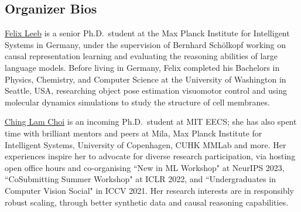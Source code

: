 \documentclass{article}
\begin{document}


\subsection{Organizer Bios}

\href{https://felixludos.com/}{Felix Leeb} 
is a senior Ph.D.\ student at the Max Planck Institute for Intelligent Systems in Germany, under the supervision of Bernhard Schölkopf working on causal representation learning and evaluating the reasoning abilities of large language models. Before living in Germany, Felix completed his Bachelors in Physics, Chemistry, and Computer Science at the University of Washington in Seattle, USA, researching object pose estimation visuomotor control and using molecular dynamics simulations to study the structure of cell membranes.

\href{https://chinglamchoi.github.io/cchoi/}{Ching Lam Choi} is an incoming Ph.D.\ student at MIT EECS; she has also spent time with brilliant mentors and peers at Mila, Max Planck Institute for Intelligent Systems, University of Copenhagen, CUHK MMLab and more. Her experiences inspire her to advocate for diverse research participation, via hosting open office hours and co-organising ``New in ML Workshop" at NeurIPS 2023, ``CoSubmitting Summer Workshop" at ICLR 2022, and ``Undergraduates in Computer Vision Social" in ICCV 2021. Her research interests are in responsibly robust scaling, through better synthetic data and causal reasoning capabilities.
\end{document}
